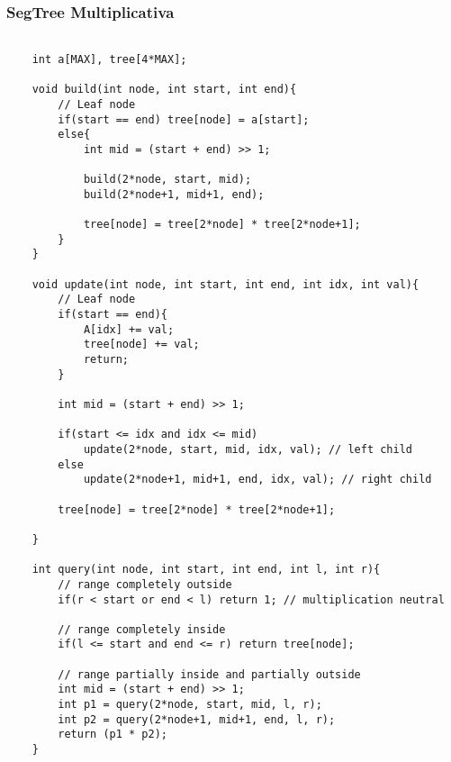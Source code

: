 \subsubsection{SegTree Multiplicativa}
\begin{verbatim}

    int a[MAX], tree[4*MAX];

    void build(int node, int start, int end){
        // Leaf node
        if(start == end) tree[node] = a[start];        
        else{
            int mid = (start + end) >> 1;
            
            build(2*node, start, mid);
            build(2*node+1, mid+1, end);
            
            tree[node] = tree[2*node] * tree[2*node+1];
        }
    }
    
    void update(int node, int start, int end, int idx, int val){
        // Leaf node
        if(start == end){
            A[idx] += val;
            tree[node] += val;
            return;
        }
    
        int mid = (start + end) >> 1;
        
        if(start <= idx and idx <= mid) 
            update(2*node, start, mid, idx, val); // left child
        else 
            update(2*node+1, mid+1, end, idx, val); // right child
        
        tree[node] = tree[2*node] * tree[2*node+1];
        
    }

    int query(int node, int start, int end, int l, int r){
        // range completely outside
        if(r < start or end < l) return 1; // multiplication neutral

        // range completely inside
        if(l <= start and end <= r) return tree[node];
        
        // range partially inside and partially outside
        int mid = (start + end) >> 1;
        int p1 = query(2*node, start, mid, l, r);
        int p2 = query(2*node+1, mid+1, end, l, r);
        return (p1 * p2);
    }
\end{verbatim}


